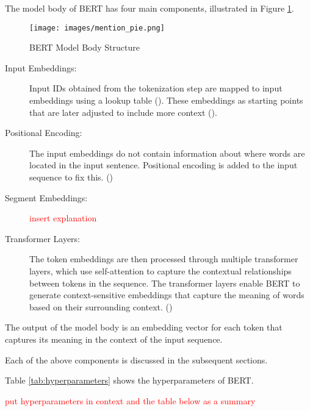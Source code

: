 
The model body of BERT has four main components, illustrated in Figure \ref{fig:bert-model-body-overview}.

\begin{figure}[H]
    \centering
    \texttt{[image: images/mention\_pie.png]}
    \caption{BERT Model Body Structure}
    \label{fig:bert-model-body-overview}
\end{figure}

\begin{description}
   \item[Input Embeddings:] Input IDs obtained from the tokenization step are mapped to input embeddings using a lookup table (\cite{rohrer_transformers_2021}). These embeddings as starting points that are later adjusted to include more context (\cite{geron_hands-machine_2019}).
   
   \item[Positional Encoding:] The input embeddings do not contain information about where words are located in the input sentence. Positional encoding is added to the input sequence to fix this. (\cite{devlin_bert_2019})
   
   \item[Segment Embeddings:] \textcolor{red}{insert explanation}
   
   \item[Transformer Layers:] The token embeddings are then processed through multiple transformer layers, which use self-attention to capture the contextual relationships between tokens in the sequence. The transformer layers enable BERT to generate context-sensitive embeddings that capture the meaning of words based on their surrounding context. (\cite{devlin_bert_2019}) 
\end{description}

The output of the model body is an embedding vector for each token that captures its meaning in the context of the input sequence. \cite{tunstall_natural_2022}

Each of the above components is discussed in the subsequent sections.

Table \ref{tab:hyperparameters} shows the hyperparameters of BERT. 

\textcolor{red}{put hyperparameters in context and the table below as a summary}

